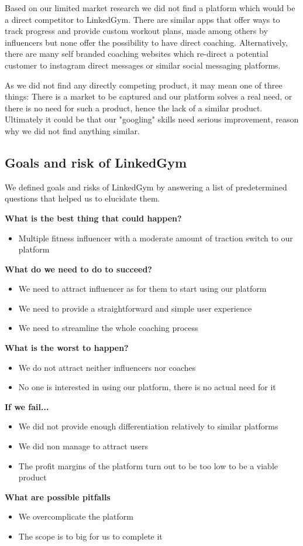 Based on our limited market research we did not find a platform which would be a direct competitor to LinkedGym. There are similar apps that offer ways to track progress and provide custom workout plans, made among others by influencers but none offer the possibility to have direct coaching. Alternatively, there are many self branded coaching websites which re-direct a potential customer to instagram direct messages or similar social messaging platforms.

As we did not find any directly competing product, it may mean one of three things: There is a market to be captured and our platform solves a real need, or there is no need for such a product, hence the lack of a similar product. Ultimately it could be that our "googling" skills need serious improvement, reason why we did not find anything similar.

\subsection{Goals and risk of LinkedGym}

We defined goals and risks of LinkedGym by answering a list of predetermined questions that helped us to elucidate them.

\textbf{What is the best thing that could happen?}
\begin{itemize}
  \item Multiple fitness influencer with a moderate amount of traction switch to our platform
\end{itemize}
\textbf{What do we need to do to succeed?}
\begin{itemize}
  \item We need to attract influencer as for them to start using our platform
  \item We need to provide a straightforward and simple user experience
  \item We need to streamline the whole coaching process
\end{itemize}

\textbf{What is the worst to happen?}
\begin{itemize}
  \item We do not attract neither influencers nor coaches
  \item No one is interested in using our platform, there is no actual need for it
\end{itemize}

\textbf{If we fail...}
\begin{itemize}
  \item We did not provide enough differentiation relatively to similar platforms
  \item We did non manage to attract users
  \item  The profit margins of the platform turn out to be too low to be a viable product
\end{itemize}


\textbf{What are possible pitfalls}
\begin{itemize}
  \item We overcomplicate the platform
  \item The scope is to big for us to complete it
\end{itemize}
